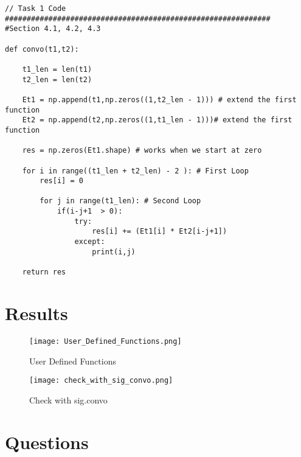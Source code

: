 \documentclass[12pt]{article}
\begin{document}
\begin{lstlisting}
// Task 1 Code
#############################################################
#Section 4.1, 4.2, 4.3

def convo(t1,t2):
    
    t1_len = len(t1)
    t2_len = len(t2)
    
    Et1 = np.append(t1,np.zeros((1,t2_len - 1))) # extend the first function
    Et2 = np.append(t2,np.zeros((1,t1_len - 1)))# extend the first function
    
    res = np.zeros(Et1.shape) # works when we start at zero
    
    for i in range((t1_len + t2_len) - 2 ): # First Loop
        res[i] = 0
        
        for j in range(t1_len): # Second Loop
            if(i-j+1  > 0):
                try: 
                    res[i] += (Et1[i] * Et2[i-j+1])
                except:
                    print(i,j)
            
    return res

\end{lstlisting}


\section*{Results}


\begin{figure}[H]
\caption{User Defined Functions}
\centering
\texttt{[image: User\_Defined\_Functions.png]}
\end{figure}

\begin{figure}[H]
\caption{Check with sig.convo}
\centering
\texttt{[image: check\_with\_sig\_convo.png]}
\end{figure}



\section*{Questions}
\end{document}
